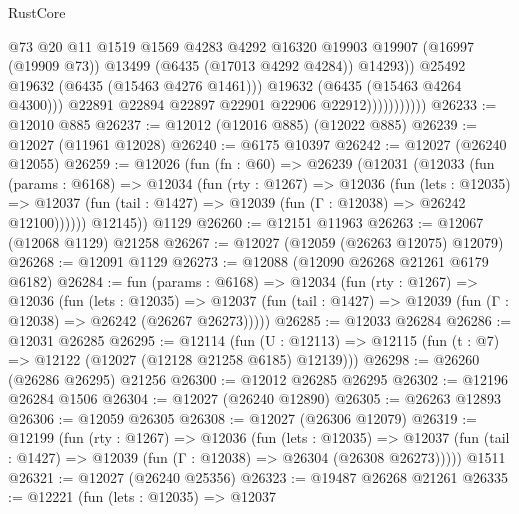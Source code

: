 \begin{lexlean}{RustCore}
\begin{coremodule}
                                  @73
                                  @20
                                  @11
                                  @1519
                                  @1569
                                  @4283
                                  @4292
                                  @16320
                                  @19903
                                  @19907
                                  (@16997 (@19909 @73))
                                  @13499
                                  (@6435 (@17013 @4292 @4284))
                                  @14293))
                              @25492
                              @19632
                              (@6435 (@15463 @4276 @1461)))
                            @19632
                            (@6435 (@15463 @4264 @4300)))
                          @22891
                          @22894
                          @22897
                          @22901
                          @22906
                          @22912)))))))))))
@26233 := @12010 @885
@26237 := @12012 (@12016 @885) (@12022 @885)
@26239 := @12027 (@11961 @12028)
@26240 := @6175 @10397
@26242 := @12027 (@26240 @12055)
@26259 := @12026
    (fun (fn : @60) =>
    @26239
      (@12031
        (@12033
          (fun (params : @6168) =>
          @12034
            (fun (rty : @1267) =>
            @12036
              (fun (lets : @12035) =>
              @12037 (fun (tail : @1427) => @12039 (fun (Γ : @12038) => @26242 @12100))))))
        @12145))
    @1129
@26260 := @12151 @11963
@26263 := @12067 (@12068 @1129) @21258
@26267 := @12027 (@12059 (@26263 @12075) @12079)
@26268 := @12091 @1129
@26273 := @12088 (@12090 @26268 @21261 @6179 @6182)
@26284 := fun (params : @6168) =>
  @12034
    (fun (rty : @1267) =>
    @12036
      (fun (lets : @12035) =>
      @12037 (fun (tail : @1427) => @12039 (fun (Γ : @12038) => @26242 (@26267 @26273)))))
@26285 := @12033 @26284
@26286 := @12031 @26285
@26295 := @12114
    (fun (U : @12113) => @12115 (fun (t : @7) => @12122 (@12027 (@12128 @21258 @6185) @12139)))
@26298 := @26260 (@26286 @26295) @21256
@26300 := @12012 @26285 @26295
@26302 := @12196 @26284 @1506
@26304 := @12027 (@26240 @12890)
@26305 := @26263 @12893
@26306 := @12059 @26305
@26308 := @12027 (@26306 @12079)
@26319 := @12199
    (fun (rty : @1267) =>
    @12036
      (fun (lets : @12035) =>
      @12037 (fun (tail : @1427) => @12039 (fun (Γ : @12038) => @26304 (@26308 @26273)))))
    @1511
@26321 := @12027 (@26240 @25356)
@26323 := @19487 @26268 @21261
@26335 := @12221
    (fun (lets : @12035) =>
    @12037

\end{coremodule}
\end{lexlean}
